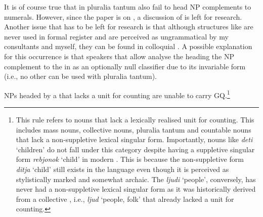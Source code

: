 \documentclass[output=paper,modfonts,newtxmath,hidelinks]{langscibook}
\begin{document}
{\begin{multicols}{2}
\end{multicols}

\noindent It is of course true that in  pluralia tantum also fail to head NP complements to numerals. However, since the  paper is on , a discussion of  is left for  research. Another issue that has to be left for  research is that although structures like  are never used in formal register and are perceived as ungrammatical by my consultants and myself, they can be found in colloquial . A possible explanation for this occurrence is that speakers that allow  analyse the  heading the NP complement to the  in  as an optionally null classifier due to its invariable form (i.e., no other  can be used with pluralia tantum).}
\newpage 

\ea \label{18:ex8} NPs headed by a  that lacks a unit for counting are unable to carry GQ.\label{18:ex:key:8}\footnote{\label{18:fn5}This rule refers to nouns that lack a lexically realised unit for counting. This includes mass nouns, collective nouns, pluralia tantum and countable nouns that lack a non-suppletive lexical singular form. Importantly, nouns like \textit{deti} ‘children’ do not fall under this category despite having a suppletive singular form \textit{rebjonok} ‘child’ in modern . This is because the non-suppletive form \textit{ditja} ‘child’ still exists in the language even though it is perceived as stylistically marked and somewhat archaic.  The  \textit{ljudi} ‘people’, conversely, has never had a non-suppletive lexical singular form as it was historically derived from a collective , i.e., \textit{ljud} ‘people, folk’ \citep{Chumakina-etal2004} that already lacked a unit for counting.
}

    \z
\end{document}
